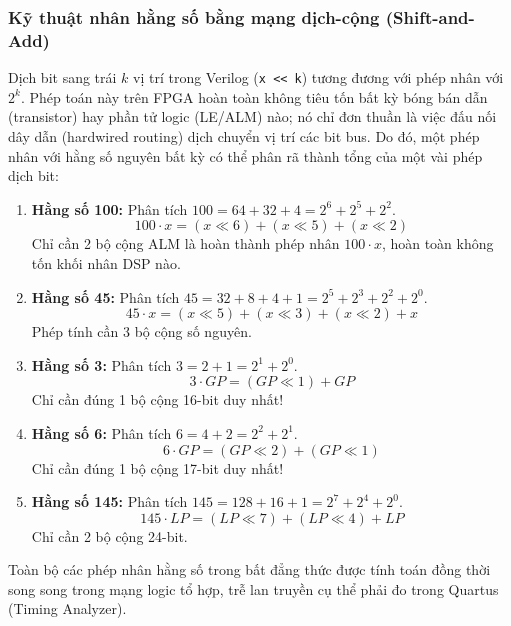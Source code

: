 \subsubsection*{Kỹ thuật nhân hằng số bằng mạng dịch-cộng (Shift-and-Add)}
Dịch bit sang trái $k$ vị trí trong Verilog (\texttt{x << k}) tương đương với phép nhân với $2^k$. Phép toán này trên FPGA hoàn toàn không tiêu tốn bất kỳ bóng bán dẫn (transistor) hay phần tử logic (LE/ALM) nào; nó chỉ đơn thuần là việc đấu nối dây dẫn (hardwired routing) dịch chuyển vị trí các bit bus. Do đó, một phép nhân với hằng số nguyên bất kỳ có thể phân rã thành tổng của một vài phép dịch bit:
\begin{enumerate}
    \item \textbf{Hằng số 100:} Phân tích $100 = 64 + 32 + 4 = 2^6 + 2^5 + 2^2$.
    \begin{equation}
        100 \cdot x = (x \ll 6) + (x \ll 5) + (x \ll 2)
    \end{equation}
    Chỉ cần 2 bộ cộng ALM là hoàn thành phép nhân $100 \cdot x$, hoàn toàn không tốn khối nhân DSP nào.
    \item \textbf{Hằng số 45:} Phân tích $45 = 32 + 8 + 4 + 1 = 2^5 + 2^3 + 2^2 + 2^0$.
    \begin{equation}
        45 \cdot x = (x \ll 5) + (x \ll 3) + (x \ll 2) + x
    \end{equation}
    Phép tính cần 3 bộ cộng số nguyên.
    \item \textbf{Hằng số 3:} Phân tích $3 = 2 + 1 = 2^1 + 2^0$.
    \begin{equation}
        3 \cdot GP = (GP \ll 1) + GP
    \end{equation}
    Chỉ cần đúng 1 bộ cộng 16-bit duy nhất!
    \item \textbf{Hằng số 6:} Phân tích $6 = 4 + 2 = 2^2 + 2^1$.
    \begin{equation}
        6 \cdot GP = (GP \ll 2) + (GP \ll 1)
    \end{equation}
    Chỉ cần đúng 1 bộ cộng 17-bit duy nhất!
    \item \textbf{Hằng số 145:} Phân tích $145 = 128 + 16 + 1 = 2^7 + 2^4 + 2^0$.
    \begin{equation}
        145 \cdot LP = (LP \ll 7) + (LP \ll 4) + LP
    \end{equation}
    Chỉ cần 2 bộ cộng 24-bit.
\end{enumerate}
Toàn bộ các phép nhân hằng số trong bất đẳng thức được tính toán đồng thời song song trong mạng logic tổ hợp, trễ lan truyền cụ thể phải đo trong Quartus (Timing Analyzer).

